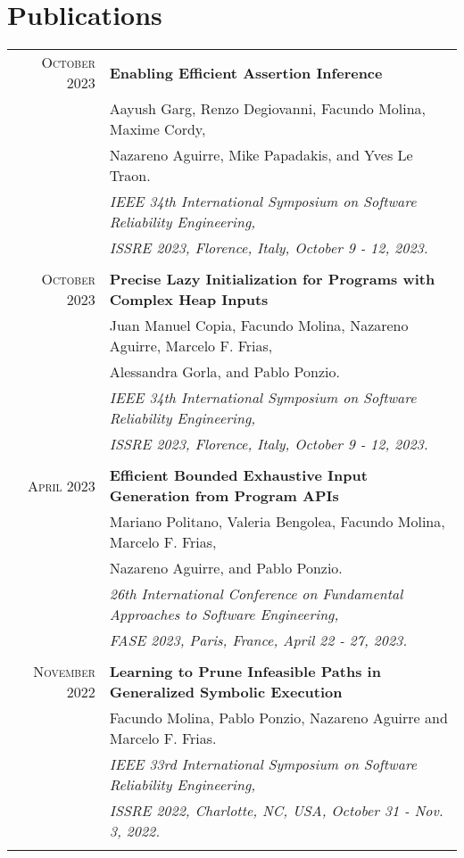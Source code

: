 \documentclass[a4paper,10pt]{article} %
\begin{document}
\section{Publications}
\begin{longtable}{rl}

\textsc{October} 2023  & \textbf{Enabling Efficient Assertion Inference} \\
        & Aayush Garg, Renzo Degiovanni, Facundo Molina, Maxime Cordy,\\
        & Nazareno Aguirre, Mike Papadakis, and Yves Le Traon. \\
        & \textit{IEEE 34th International Symposium on Software Reliability Engineering,} \\
        & \textit{ISSRE 2023, Florence, Italy, October 9 - 12, 2023.} \\ & \\

\textsc{October} 2023  & \textbf{Precise Lazy Initialization for Programs with Complex Heap Inputs} \\
        & Juan Manuel Copia, Facundo Molina, Nazareno Aguirre, Marcelo F. Frias,\\
        & Alessandra Gorla, and Pablo Ponzio. \\
        & \textit{IEEE 34th International Symposium on Software Reliability Engineering,} \\
        & \textit{ISSRE 2023, Florence, Italy, October 9 - 12, 2023.} \\ & \\

\textsc{April} 2023  & \textbf{Efficient Bounded Exhaustive Input Generation from Program APIs} \\
        & Mariano Politano, Valeria Bengolea, Facundo Molina, Marcelo F. Frias,\\
        & Nazareno Aguirre, and Pablo Ponzio. \\
	& \textit{26th International Conference on Fundamental Approaches to Software Engineering,} \\
        & \textit{FASE 2023, Paris, France, April 22 - 27, 2023.} \\ & \\

\textsc{November} 2022  & \textbf{Learning to Prune Infeasible Paths in Generalized Symbolic Execution} \\
        & Facundo Molina, Pablo Ponzio, Nazareno Aguirre and Marcelo F. Frias.\\
        & \textit{IEEE 33rd International Symposium on Software Reliability Engineering,} \\
        & \textit{ISSRE 2022, Charlotte, NC, USA, October 31 - Nov. 3, 2022.} \\ & \\


\end{longtable}
\end{document}
